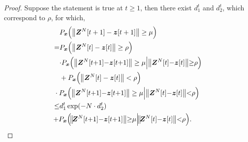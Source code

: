 \documentclass[11pt,twocolumn]{IEEEtran}
\begin{document}
\begin{proof}
Suppose the statement is true at $t\geq 1$, then there exist $d_1^t$ and $d_2^t$, which correspond to $\rho$, for which,
\begin{align}
&P_{\bm x}\Big(\big\| \bm Z^{N}[t+1]-\bm z[t+1] \big\| \geq \mu \Big)\nonumber \\
=&P_{\bm x}\Big(\big\| \bm Z^{N}[t]-\bm z[t] \big\| \geq \rho \Big)\nonumber\\
&{\cdot} P_{\bm x}\Big(\big\| \bm Z^{N}[t{+}1]{-}\bm z[t{+}1] \big\| \geq \mu \Big| \big\| \bm Z^{N}[t]{-}\bm z[t] \big\|{\geq}\rho \Big) \nonumber \\
&+ P_{\bm x}\Big(\big\| \bm Z^{N}[t]-\bm z[t] \big\| < \rho \Big)\nonumber\\
&\hspace{-8pt}\cdot P_{\bm x}\Big(\big\| \bm Z^{N}[t{+}1]{-}\bm z[t{+}1] \big\| \geq \mu \Big| \big\| \bm Z^{N}[t]{-}\bm z[t] \big\| {<} \rho \Big) \nonumber \\
\leq& d_1^t\exp(-N\cdot d_2^t)\nonumber\\
&\hspace{-9pt}{+}P_{\bm x}\Big(\hspace{-2pt}\big\|\hspace{-2pt}\bm Z^{N}[t{+}1]{-}\bm z[t{+}1] \big\| {\geq} \mu \Big|\hspace{-2pt}\big\| \hspace{-2pt}\bm Z^{N}[t]{-}\bm z[t] \big\| {<} \rho \Big).\hspace{-3pt}\label{eq:t2_1}
\end{align}


\end{proof}
\end{document}
